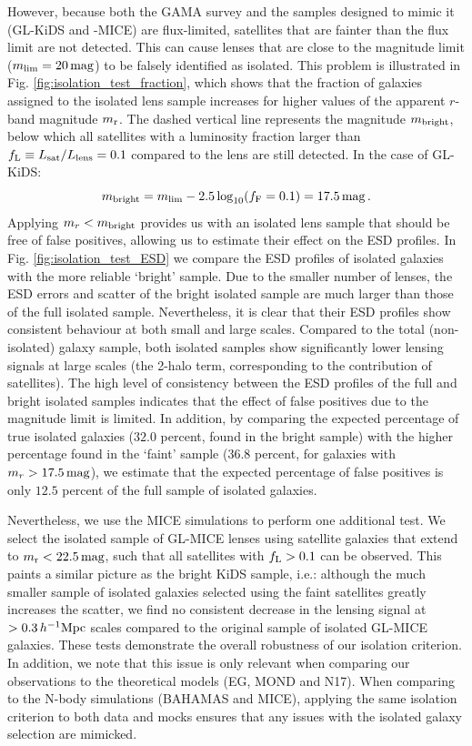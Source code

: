 \documentclass[usenatbib]{mnras}
\newcommand{\hMpc}{\, h^{-1}{\rm{Mpc}} }
\newcommand{\magn}{\, {\rm mag} }
\newcommand{\un}[1]{_{\rm #1}}
\begin{document}
However, because both the GAMA survey and the samples designed to mimic it (GL-KiDS and -MICE) are flux-limited, satellites that are fainter than the flux limit are not detected. This can cause lenses that are close to the magnitude limit ($m\un{lim}=20 \magn$) to be falsely identified as isolated. This problem is illustrated in Fig. \ref{fig:isolation_test_fraction}, which shows that the fraction of galaxies assigned to the isolated lens sample increases for higher values of the apparent $r$-band magnitude $m\un{r}$. The dashed vertical line represents the magnitude $m\un{bright}$, below which all satellites with a luminosity fraction larger than $f\un{L} \equiv L\un{sat}/L\un{lens}=0.1$ compared to the lens are still detected. In the case of GL-KiDS:
\begin{equation}
	m\un{bright} = m\un{lim} - 2.5 \log_{10}(f\un{F}=0.1) = 17.5 \magn \, .
\end{equation}
Applying $m_r < m\un{bright}$ provides us with an isolated lens sample that should be free of false positives, allowing us to estimate their effect on the ESD profiles. In Fig. \ref{fig:isolation_test_ESD} we compare the ESD profiles of isolated galaxies with the more reliable `bright' sample. Due to the smaller number of lenses, the ESD errors and scatter of the bright isolated sample are much larger than those of the full isolated sample. Nevertheless, it is clear that their ESD profiles show consistent behaviour at both small and large scales. Compared to the total (non-isolated) galaxy sample, both isolated samples show significantly lower lensing signals at large scales (the 2-halo term, corresponding to the contribution of satellites). The high level of consistency between the ESD profiles of the full and bright isolated samples indicates that the effect of false positives due to the magnitude limit is limited. In addition, by comparing the expected percentage of true isolated galaxies ($32.0$ percent, found in the bright sample) with the higher percentage found in the `faint' sample ($36.8$ percent, for galaxies with $m_r > 17.5 \magn$), we estimate that the expected percentage of false positives is only $12.5$ percent of the full sample of isolated galaxies.

Nevertheless, we use the MICE simulations to perform one additional test. We select the isolated sample of GL-MICE lenses using satellite galaxies that extend to $m\un{r}<22.5 \magn$, such that all satellites with $f\un{L}>0.1$ can be observed. This paints a similar picture as the bright KiDS sample, i.e.: although the much smaller sample of isolated galaxies selected using the faint satellites greatly increases the scatter, we find no consistent decrease in the lensing signal at $>0.3\hMpc$ scales compared to the original sample of isolated GL-MICE galaxies. These tests demonstrate the overall robustness of our isolation criterion. In addition, we note that this issue is only relevant when comparing our observations to the theoretical models (EG, MOND and N17). When comparing to the N-body simulations (BAHAMAS and MICE), applying the same isolation criterion to both data and mocks ensures that any issues with the isolated galaxy selection are mimicked.
\end{document}
